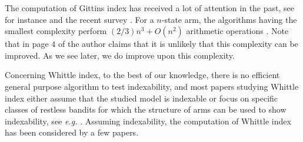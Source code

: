 The computation of Gittins index has received a lot of attention in the past, see for instance \cite{chen1986linear, katehakis1987multi, nino20072, sonin2008generalized} and the recent survey \cite{chakravorty2014multi}.
For a $n$-state arm, the algorithms having the smallest complexity perform $(2/3)n^3+O(n^2)$ arithmetic operations \cite{chakravorty2014multi}.
Note that in page $4$ of \cite{nino2020fast} the author claims that it is unlikely that this complexity can be improved.
As we see later, we do improve upon this complexity. 

Concerning Whittle index, to the best of our knowledge, there is no efficient general purpose algorithm to test indexability, and most papers studying Whittle index either assume that the studied model is indexable or focus on specific classes of restless bandits for which the structure of arms can be used to show indexability, see \emph{e.g.} \cite{aalto2011properties,akbarzadeh2019restless,akbarzadeh2021maintenance,borkar2017whittle}.
Assuming indexability, the computation of Whittle index has been considered by a few papers.

